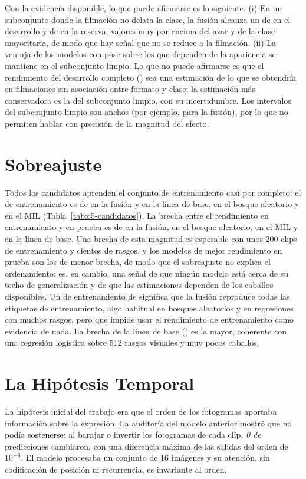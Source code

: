 Con la evidencia disponible, lo que puede afirmarse es lo siguiente. (i) En un subconjunto donde la filmación no delata la clase, la fusión alcanza un \fmacro{} de \FusionLimpioF{} en el desarrollo y de \FusionReservaLimpio{} en la reserva, valores muy por encima del azar y de la clase mayoritaria, de modo que hay señal que no se reduce a la filmación. (ii) La ventaja de los modelos con pose sobre los que dependen de la apariencia se mantiene en el subconjunto limpio. Lo que no puede afirmarse es que el rendimiento del desarrollo completo (\FusionDevF{}) sea una estimación de lo que se obtendría en filmaciones sin asociación entre formato y clase; la estimación más conservadora es la del subconjunto limpio, con su incertidumbre. Los intervalos del subconjunto limpio son anchos (por ejemplo, \FusionAgrupLimpioIC{} para la fusión), por lo que no permiten hablar con precisión de la magnitud del efecto.

\section{Sobreajuste}
Todos los candidatos aprenden el conjunto de entrenamiento casi por completo: el \fmacro{} de entrenamiento es de \FusionTrainF{} en la fusión y en la línea de base, \RFPoseTrainF{} en el bosque aleatorio y \MILTrainF{} en el MIL (Tabla~\ref{tab:c5-candidatos}). La brecha entre el rendimiento en entrenamiento y en prueba es de \FusionGap{} en la fusión, \RFPoseGap{} en el bosque aleatorio, \MILGap{} en el MIL y \BaseGap{} en la línea de base. Una brecha de esta magnitud es esperable con unos 200 clips de entrenamiento y cientos de rasgos, y los modelos de mejor rendimiento en prueba son los de menor brecha, de modo que el sobreajuste no explica el ordenamiento; es, en cambio, una señal de que ningún modelo está cerca de su techo de generalización y de que las estimaciones dependen de los caballos disponibles. Un \fmacro{} de entrenamiento de \FusionTrainF{} significa que la fusión reproduce todas las etiquetas de entrenamiento, algo habitual en bosques aleatorios y en regresiones con muchos rasgos, pero que impide usar el rendimiento de entrenamiento como evidencia de nada. La brecha de la línea de base (\BaseGap{}) es la mayor, coherente con una regresión logística sobre 512 rasgos visuales y muy pocos caballos.

\section{La Hipótesis Temporal}
La hipótesis inicial del trabajo era que el orden de los fotogramas aportaba información sobre la expresión. La auditoría del modelo anterior mostró que no podía sostenerse: al barajar o invertir los fotogramas de cada clip, \textit{0 de \ClipsTotal{}} predicciones cambiaron, con una diferencia máxima de las salidas del orden de $10^{-6}$. El modelo procesaba un conjunto de 16 imágenes y su atención, sin codificación de posición ni recurrencia, es invariante al orden.

